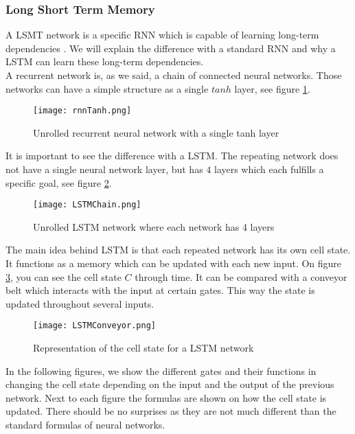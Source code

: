 \subsubsection{Long Short Term Memory}
\label{sec:lstm}

A LSMT network is a specific RNN which is capable of learning long-term dependencies \cite{lstmDep:thesis}. We will explain the difference with a standard RNN and why a LSTM can learn these long-term dependencies. \\

A recurrent network is, as we said, a chain of connected neural networks. Those networks can have a simple structure as a single $tanh$ layer, see figure \ref{fig:rnnTanh}.

\begin{figure}[H]
	\centering
	\texttt{[image: rnnTanh.png]}
	\caption{Unrolled recurrent neural network with a single tanh layer \cite{lstmGood:online}}
	\label{fig:rnnTanh}
\end{figure} 

It is important to see the difference with a LSTM. The repeating network does not have a single neural network layer, but has $4$ layers which each fulfills a specific goal, see figure \ref{fig:LSTMChain}.

\begin{figure}[H]
	\centering
	\texttt{[image: LSTMChain.png]}
	\caption{Unrolled LSTM network where each network has 4 layers \cite{lstmGood:online}}
	\label{fig:LSTMChain}
\end{figure} 

The main idea behind LSTM is that each repeated network has its own cell state. It functions as a  memory which can be updated with each new input. On figure \ref{fig:LSTMConveyor}, you can see the cell state $C$ through time. It can be compared with a conveyor belt which interacts with the input at certain gates. This way the state is updated throughout several inputs.

\begin{figure}[H]
	\centering
	\texttt{[image: LSTMConveyor.png]}
	\caption{Representation of the cell state for a LSTM network \cite{lstmGood:online}}
	\label{fig:LSTMConveyor}
\end{figure} 

In the following figures, we show the different gates and their functions in changing the cell state depending on the input and the output of the previous network. Next to each figure the formulas are shown on how the cell state is updated. There should be no surprises as they are not much different than the standard formulas of neural networks. \\

